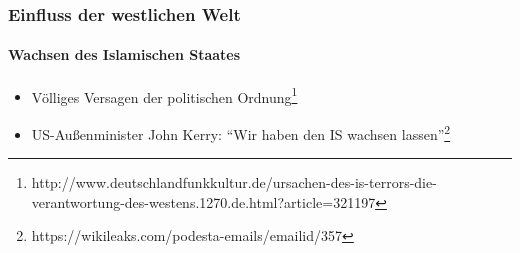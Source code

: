 \documentclass[10pt,a4paper]{beamer}
\newcommand{\ftn}[2]{\footnote[#1]{\tiny #2}}
\begin{document}
\begin{frame}
\frametitle{Einfluss der westlichen Welt}
\framesubtitle{Wachsen des Islamischen Staates}
\begin{itemize}
\item Völliges Versagen der politischen Ordnung\ftn{3}{http://www.deutschlandfunkkultur.de/ursachen-des-is-terrors-die-verantwortung-des-westens.1270.de.html?article=321197}
\pause  
\item US-Außenminister John Kerry: \enquote{Wir haben den IS wachsen lassen}\ftn{4}{https://wikileaks.com/podesta-emails/emailid/357}
\end{itemize}
\end{frame}

\begin{frame}
\titlepage
\end{frame}
\end{document}
